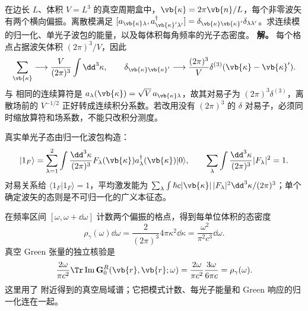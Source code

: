 \begin{exbox}
在边长 $L$、体积 $V=L^3$ 的真空周期盒中，$\vb{\kappa}=2\pi\vb{n}/L$，每个非零波矢有两个横向偏振。离散模满足 $[a_{\vb{\kappa}\lambda},a_{\vb{\kappa}'\lambda'}^\dagger]=\delta_{\vb{\kappa}\vb{\kappa}'}\delta_{\lambda\lambda'}$。求连续模的归一化、单光子波包的能量，以及每体积每角频率的光子态密度。
\textbf{解。} 每个格点占据波矢体积 $(2\pi)^3/V$，因此
\begin{equation*}
 \sum_{\vb{\kappa}}\longrightarrow\frac{V}{(2\pi)^3}\int\dd^3\kappa,
 \qquad \delta_{\vb{\kappa}\vb{\kappa}'}
 \longrightarrow\frac{(2\pi)^3}{V}\delta^{(3)}(\vb{\kappa}-\vb{\kappa}').
\end{equation*}
与 相同的连续算符是 $a_\lambda(\vb{\kappa})=\sqrt V\,a_{\vb{\kappa}\lambda}$，故其对易子为 $(2\pi)^3\delta^{(3)}$，离散场前的 $V^{-1/2}$ 正好转成连续积分系数。若改用没有 $(2\pi)^3$ 的 $\delta$ 对易子，必须同时缩放算符和场系数，不能只改积分测度。

真实单光子态由归一化波包构造：
\begin{equation}
 |1_F\rangle=\sum_{\lambda=1}^2\int\frac{\dd^3\kappa}{(2\pi)^3}
 F_\lambda(\vb{\kappa})a_\lambda^\dagger(\vb{\kappa})|0\rangle,
 \qquad \sum_\lambda\int\frac{\dd^3\kappa}{(2\pi)^3}|F_\lambda|^2=1.
 \label{eq:feqo-normalized-photon-wavepacket}
\end{equation}
对易关系给 $\langle1_F|1_F\rangle=1$，平均激发能为
$\sum_\lambda\int\hbar c|\vb{\kappa}|\,|F_\lambda|^2\dd^3\kappa/(2\pi)^3$；单个确定波矢的态则是不可归一化的广义本征态。

在频率区间 $[\omega,\omega+\dd\omega]$ 计数两个偏振的格点，得到每单位体积的态密度
\begin{equation}
 \rho_\gamma(\omega)\dd\omega
 =\frac{2}{(2\pi)^3}4\pi\kappa^2\dd\kappa
 =\frac{\omega^2}{\pi^2c^3}\dd\omega.
 \label{eq:feqo-vacuum-photon-density}
\end{equation}
真空 Green 张量的独立核验是
\begin{equation*}
 \frac{2\omega}{\pi c^2}\Tr\operatorname{Im}\mathbf G_0^R(\vb{r},\vb{r};\omega)
 =\frac{2\omega}{\pi c^2}\frac{3\omega}{6\pi c}
 =\rho_\gamma(\omega).
\end{equation*}
这里用了 附近得到的真空局域谱；它把模式计数、每光子能量和 Green 响应的归一化连在一起。
\end{exbox}

